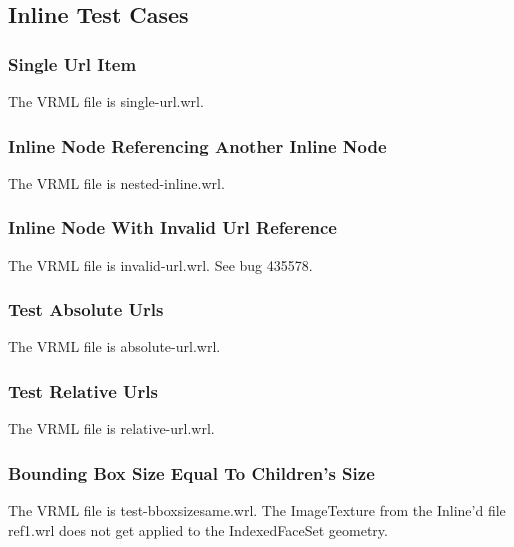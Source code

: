 \documentclass[12pt,letterpaper]{article}
\newcommand{\SpGrA}{Single Url Item}
\newcommand{\SpGrB}{Inline Node Referencing Another Inline Node}
\newcommand{\SpGrC}{Inline Node With Invalid Url Reference}
\newcommand{\SpGrD}{Test Absolute Urls}
\newcommand{\SpGrE}{Test Relative Urls}
\newcommand{\SpGrF}{Bounding Box Size Equal To Children's Size}
\begin{document}
\subsection{Inline Test Cases}

\subsubsection{\SpGrA}
The VRML file is single-url.wrl.

\subsubsection{\SpGrB}
The VRML file is nested-inline.wrl.

\subsubsection{\SpGrC}
The VRML file is invalid-url.wrl.
See bug 435578.

\subsubsection{\SpGrD}
The VRML file is absolute-url.wrl.

\subsubsection{\SpGrE}
The VRML file is relative-url.wrl.

\subsubsection{\SpGrF}
The VRML file is test-bboxsizesame.wrl.\newline
The ImageTexture from the Inline'd file ref1.wrl does not get
applied to the IndexedFaceSet geometry.
\end{document}
